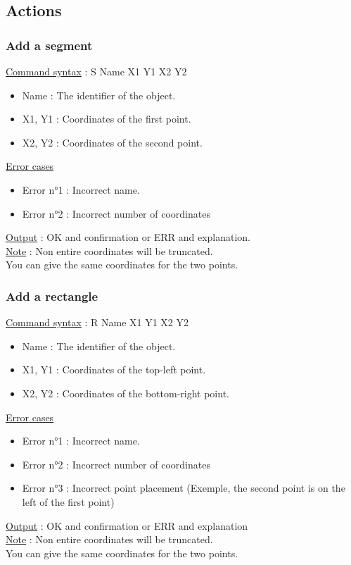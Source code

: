 \documentclass[a4paper, 12pts]{article}
\begin{document}
	\subsection{Actions}
		\subsubsection{Add a segment}
			\uline{Command syntax} :
			S Name X1 Y1 X2 Y2
			\begin{itemize}
				\item Name : The identifier of the object.
				\item X1, Y1 : Coordinates of the first point.
				\item X2, Y2 : Coordinates of the second point.
			\end{itemize}
			\uline{Error cases}
			\begin{itemize}
				\item Error n°1 : Incorrect name.
				\item Error n°2 : Incorrect number of coordinates
			\end{itemize}
			\uline{Output} : OK and confirmation or ERR and explanation.\\
			\uline{Note} : 
			Non entire coordinates will be truncated.\\
			You can give the same coordinates for the two points.

		\subsubsection{Add a rectangle}
			\uline{Command syntax} :
			R Name X1 Y1 X2 Y2
			\begin{itemize}
				\item Name : The identifier of the object.
				\item X1, Y1 : Coordinates of the top-left point.
				\item X2, Y2 : Coordinates of the bottom-right point.
			\end{itemize}
			\uline{Error cases}
			\begin{itemize}
				\item Error n°1 : Incorrect name.
				\item Error n°2 : Incorrect number of coordinates
				\item Error n°3 : Incorrect point placement (Exemple, the second point is on the left of the first point)
			\end{itemize}
			\uline{Output} : OK and confirmation or ERR and explanation\\
			\uline{Note} : 
			Non entire coordinates will be truncated.\\
			You can give the same coordinates for the two points.
\end{document}
